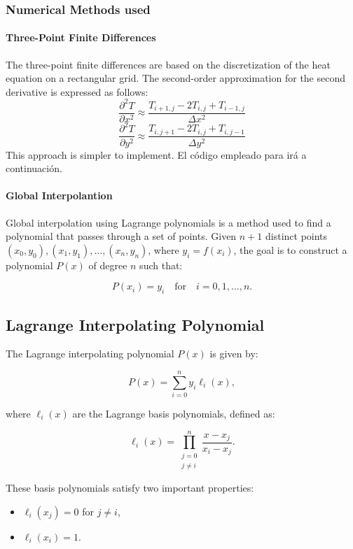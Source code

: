 \newpage



\subsubsection{Numerical Methods used}

\paragraph{ Three-Point Finite Differences}

The three-point finite differences are based on the discretization of the heat equation on a rectangular grid. The second-order approximation for the second derivative is expressed as follows:
\[
\frac{\partial^2 T}{\partial x^2} \approx \frac{T_{i+1,j} - 2T_{i,j} + T_{i-1,j}}{\Delta x^2}
\]
\[
\frac{\partial^2 T}{\partial y^2} \approx \frac{T_{i,j+1} - 2T_{i,j} + T_{i,j-1}}{\Delta y^2}
\]
This approach is simpler to implement. El código empleado para irá a continuación.



\paragraph{ Global Interpolantion}





Global interpolation using Lagrange polynomials is a method used to find a polynomial that passes through a set of points. Given \( n+1 \) distinct points \( (x_0, y_0), (x_1, y_1), \dots, (x_n, y_n) \), where \( y_i = f(x_i) \), the goal is to construct a polynomial \( P(x) \) of degree \( n \) such that:

\[
P(x_i) = y_i \quad \text{for} \quad i = 0, 1, \dots, n.
\]

\subsection*{Lagrange Interpolating Polynomial}
The Lagrange interpolating polynomial \( P(x) \) is given by:

\[
P(x) = \sum_{i=0}^{n} y_i \ell_i(x),
\]

where \( \ell_i(x) \) are the Lagrange basis polynomials, defined as:

\[
\ell_i(x) = \prod_{\substack{j=0 \\ j \neq i}}^{n} \frac{x - x_j}{x_i - x_j}.
\]

These basis polynomials satisfy two important properties:
\begin{itemize}
    \item \( \ell_i(x_j) = 0 \) for \( j \neq i \),
    \item \( \ell_i(x_i) = 1 \).
\end{itemize}

